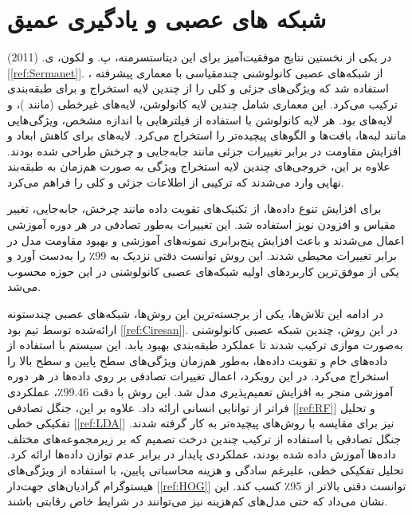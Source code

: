 \section{شبکه های عصبی و یادگیری عمیق}
در یکی از نخستین نتایج موفقیت‌آمیز برای این دیتاستسرمنه، پ. و لکون، ی. (2011) [\ref{ref:Sermanet}]. ، از شبکه‌های عصبی کانولوشنی چندمقیاسی با معماری پیشرفته استفاده شد که ویژگی‌های جزئی و کلی را از چندین لایه استخراج و برای طبقه‌بندی ترکیب می‌کرد. این معماری شامل چندین لایه کانولوشن، لایه‌های غیرخطی (مانند )، و لایه‌های  بود. هر لایه کانولوشن با استفاده از فیلترهایی با اندازه مشخص، ویژگی‌هایی مانند لبه‌ها، بافت‌ها و الگوهای پیچیده‌تر را استخراج می‌کرد. لایه‌های  برای کاهش ابعاد و افزایش مقاومت در برابر تغییرات جزئی مانند جابه‌جایی و چرخش طراحی شده بودند. علاوه بر این، خروجی‌های چندین لایه استخراج ویژگی به صورت هم‌زمان به طبقه‌بند نهایی وارد می‌شدند که ترکیبی از اطلاعات جزئی و کلی را فراهم می‌کرد.

برای افزایش تنوع داده‌ها، از تکنیک‌های تقویت داده مانند چرخش، جابه‌جایی، تغییر مقیاس و افزودن نویز استفاده شد. این تغییرات به‌طور تصادفی در هر دوره آموزشی اعمال می‌شدند و باعث افزایش پنج‌برابری نمونه‌های آموزشی و بهبود مقاومت مدل در برابر تغییرات محیطی شدند. این روش توانست دقتی نزدیک به 99٪ را به‌دست آورد و یکی از موفق‌ترین کاربردهای اولیه شبکه‌های عصبی کانولوشنی در این حوزه محسوب می‌شد.

در ادامه این تلاش‌ها، یکی از برجسته‌ترین این روش‌ها، شبکه‌های عصبی چندستونه ارائه‌شده توسط تیم  بود [\ref{ref:Ciresan}]. در این روش، چندین شبکه عصبی کانولوشنی به‌صورت موازی ترکیب شدند تا عملکرد طبقه‌بندی بهبود یابد. این سیستم با استفاده از داده‌های خام و تقویت داده‌ها، به‌طور هم‌زمان ویژگی‌های سطح پایین و سطح بالا را استخراج می‌کرد. در این رویکرد، اعمال تغییرات تصادفی بر روی داده‌ها در هر دوره آموزشی منجر به افزایش تعمیم‌پذیری مدل شد. این روش با دقت 99.46٪، عملکردی فراتر از توانایی انسانی ارائه داد. علاوه بر این، جنگل تصادفی [\ref{ref:RF}] و تحلیل تفکیکی خطی [\ref{ref:LDA}] نیز برای مقایسه با روش‌های پیچیده‌تر به کار گرفته شدند. جنگل تصادفی با استفاده از ترکیب چندین درخت تصمیم که بر زیرمجموعه‌های مختلف داده‌ها آموزش داده شده بودند، عملکردی پایدار در برابر عدم توازن داده‌ها ارائه کرد. تحلیل تفکیکی خطی، علیرغم سادگی و هزینه محاسباتی پایین، با استفاده از ویژگی‌های هیستوگرام گرادیان‌های جهت‌دار [\ref{ref:HOG}] توانست دقتی بالاتر از 95٪ کسب کند. این نشان می‌داد که حتی مدل‌های کم‌هزینه نیز می‌توانند در شرایط خاص رقابتی باشند.

